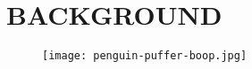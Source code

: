 \documentclass[../main/main.tex]{subfiles}
\begin{document}
\section{BACKGROUND}

\begin{figure}[H]
\centering
\texttt{[image: penguin-puffer-boop.jpg]}
\end{figure}
\end{document}
